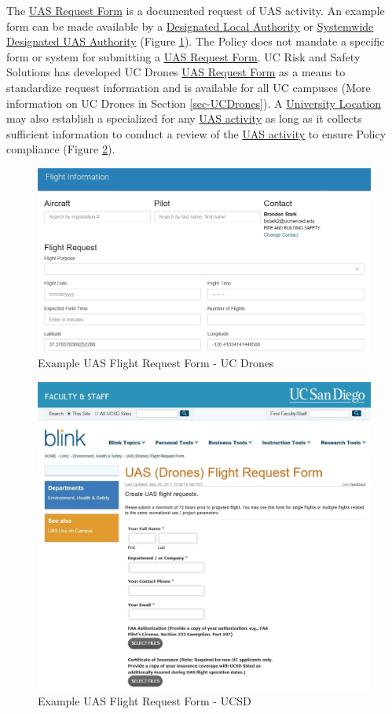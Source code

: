\documentclass[
]{book}
\begin{document}
The \protect\hyperlink{FR}{UAS Request Form} is a documented request of UAS activity. An example form can be made available by a \protect\hyperlink{DLA}{Designated Local Authority} or \protect\hyperlink{SDA}{Systemwide Designated UAS Authority} (Figure \ref{fig:nice-fig2}). The Policy does not mandate a specific form or system for submitting a \protect\hyperlink{FR}{UAS Request Form}. UC Risk and Safety Solutions has developed UC Drones \protect\hyperlink{FR}{UAS Request Form} as a means to standardize request information and is available for all UC campuses (More information on UC Drones in Section \ref{sec-UCDrones}). A \protect\hyperlink{UL}{University Location} may also establish a specialized for any \protect\hyperlink{UASactivity}{UAS activity} as long as it collects sufficient information to conduct a review of the \protect\hyperlink{UASactivity}{UAS activity} to ensure Policy compliance (Figure \ref{fig:flight-request-ucsd}).

\begin{figure}

{\centering \includegraphics[width=0.5\linewidth]{images/flight_request1} 

}

\caption{Example UAS Flight Request Form - UC Drones}\label{fig:nice-fig2}
\end{figure}

\begin{figure}

{\centering \includegraphics[width=0.5\linewidth]{images/flight_request2} 

}

\caption{Example UAS Flight Request Form - UCSD}\label{fig:flight-request-ucsd}
\end{figure}
\end{document}
